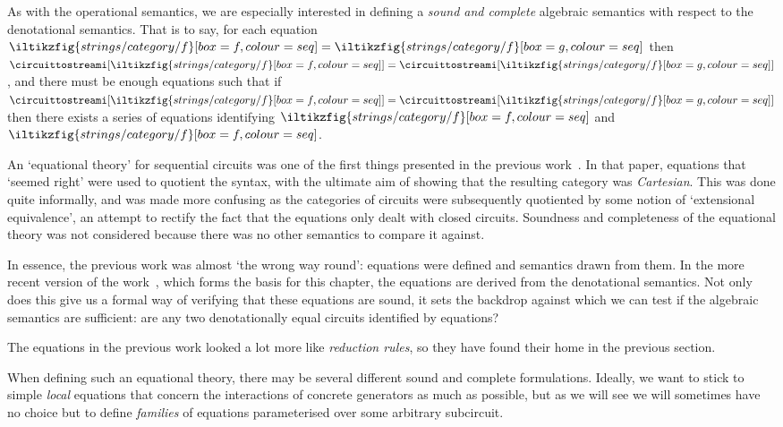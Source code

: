 As with the operational semantics, we are especially interested in defining a
\emph{sound and complete} algebraic semantics with respect to the denotational
semantics.
That is to say, for each equation \(
\iltikzfig{strings/category/f}[box=f,colour=seq]
=
\iltikzfig{strings/category/f}[box=g,colour=seq]
\) then \(
\circuittostreami[\iltikzfig{strings/category/f}[box=f,colour=seq]]
=
\circuittostreami[\iltikzfig{strings/category/f}[box=g,colour=seq]]
\), and there must be enough equations such that if \(
\circuittostreami[\iltikzfig{strings/category/f}[box=f,colour=seq]]
=
\circuittostreami[\iltikzfig{strings/category/f}[box=g,colour=seq]]
\) then there exists a series of equations identifying \(
\iltikzfig{strings/category/f}[box=f,colour=seq]
\) and \(
\iltikzfig{strings/category/f}[box=f,colour=seq]
\).

\begin{remark}
    An `equational theory' for sequential circuits was one of the first things
    presented in the previous
    work~\cite{ghica2016categorical,ghica2017diagrammatic}.
    In that paper, equations that `seemed right' were used to quotient the
    syntax, with the ultimate aim of showing that the resulting category was
    \emph{Cartesian}.
    This was done quite informally, and was made more confusing as
    the categories of circuits were subsequently quotiented by some notion of
    `extensional equivalence', an attempt to rectify the fact that the
    equations only dealt with closed circuits.
    Soundness and completeness of the equational theory was not considered
    because there was no other semantics to compare it against.

    In essence, the previous work was almost `the wrong way round': equations
    were defined and semantics drawn from them.
    In the more recent version of the work~\cite[Sec. 5]{ghica2024fully}, which
    forms the basis for this chapter, the equations are derived from the
    denotational semantics.
    Not only does this give us a formal way of verifying that these equations
    are sound, it sets the backdrop against which we can test if the algebraic
    semantics are sufficient: are any two denotationally equal circuits
    identified by equations?

    The equations in the previous work looked a lot more like
    \emph{reduction rules}, so they have found their home in the previous
    section.
\end{remark}

When defining such an equational theory, there may be several different sound
and complete formulations.
Ideally, we want to stick to simple \emph{local} equations that concern the
interactions of concrete generators as much as possible, but as we will see
we will sometimes have no choice but to define \emph{families} of equations
parameterised over some arbitrary subcircuit.






